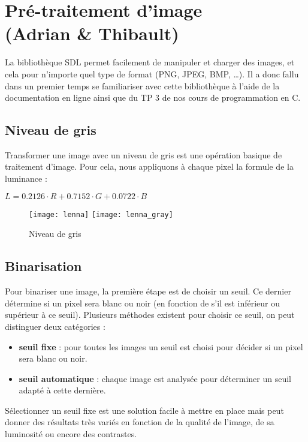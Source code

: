 \chapter{Pré-traitement d'image\\ (Adrian \& Thibault)}

La bibliothèque SDL permet facilement de manipuler et charger des images, et
cela pour n'importe quel type de format (PNG, JPEG, BMP, \ldots). Il a donc
fallu dans un premier temps se familiariser avec cette bibliothèque à l'aide de
la documentation en ligne ainsi que du TP 3 de nos cours de programmation en C.

\section{Niveau de gris}

Transformer une image avec un niveau de gris est une opération basique de
traitement d'image. Pour cela, nous appliquons à chaque pixel la formule de la
luminance :

$L = 0.2126 \cdot R + 0.7152 \cdot G + 0.0722 \cdot B$

\begin{figure}[H]
    \centering
    \texttt{[image: lenna]}
    \texttt{[image: lenna\_gray]}
    \caption{Niveau de gris}
\end{figure}

\section{Binarisation}

Pour binariser une image, la première étape est de choisir un seuil. Ce dernier
détermine si un pixel sera blanc ou noir (en fonction de s'il est inférieur ou
supérieur à ce seuil). Plusieurs méthodes existent pour choisir ce seuil, on
peut distinguer deux catégories :

\begin{itemize}
    \item \textbf{seuil fixe} : pour toutes les images un seuil est choisi pour
        décider si un pixel sera blanc ou noir.
    \item \textbf{seuil automatique} : chaque image est analysée pour déterminer
        un seuil adapté à cette dernière.
\end{itemize}

Sélectionner un seuil fixe est une solution facile à mettre en place mais peut
donner des résultats très variés en fonction de la qualité de l'image, de sa
luminosité ou encore des contrastes.

